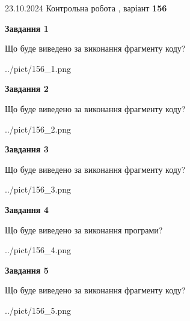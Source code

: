 \documentclass[12pt, ukrainian]{article}
\begin{document}
{\Large{23.10.2024 Контрольна робота , варіант  \No \textbf { 156 }\par}}
{
\begin {large}
{\begin {center}\textbf{Завдання 1}\end {center}}

Що буде виведено за виконання фрагменту коду?\par
\begin{center}
	{../pict/156_1.png}
\end{center}
\newpage

{\begin {center}\textbf{Завдання 2}\end {center}}

Що буде виведено за виконання фрагменту коду?\par
\begin{center}
	{../pict/156_2.png}
\end{center}
\newpage

{\begin {center}\textbf{Завдання 3}\end {center}}

Що буде виведено за виконання фрагменту коду?\par
\begin{center}
	{../pict/156_3.png}
\end{center}
\newpage

{\begin {center}\textbf{Завдання 4}\end {center}}

Що буде виведено за виконання програми?\par
\begin{center}
	{../pict/156_4.png}
\end{center}
\newpage

{\begin {center}\textbf{Завдання 5}\end {center}}

Що буде виведено за виконання фрагменту коду?\par
\begin{center}
	{../pict/156_5.png}
\end{center}
\newpage


\end{large}}
\end{document}
